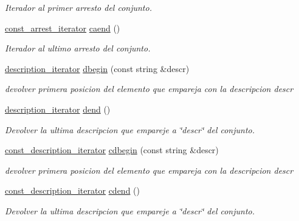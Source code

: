 \begin{DoxyCompactItemize}
\begin{DoxyCompactList}\small\item\em Iterador al primer arresto del conjunto. \end{DoxyCompactList}\item 
\hyperlink{classconjunto_1_1const__arrest__iterator}{const\+\_\+arrest\+\_\+iterator} \hyperlink{classconjunto_af162d00713358699bc36300616c90e89}{caend} ()
\begin{DoxyCompactList}\small\item\em Iterador al ultimo arresto del conjunto. \end{DoxyCompactList}\item 
\hyperlink{classconjunto_1_1description__iterator}{description\+\_\+iterator} \hyperlink{classconjunto_a67554c4c219143b596ba82ec29508e93}{dbegin} (const string \&descr)
\begin{DoxyCompactList}\small\item\em devolver primera posicion del elemento que empareja con la descripcion descr \end{DoxyCompactList}\item 
\hyperlink{classconjunto_1_1description__iterator}{description\+\_\+iterator} \hyperlink{classconjunto_af821d3bc50f2926a95aaa39a04c1ce7e}{dend} ()
\begin{DoxyCompactList}\small\item\em Devolver la ultima descripcion que empareje a \char`\"{}descr\char`\"{} del conjunto. \end{DoxyCompactList}\item 
\hyperlink{classconjunto_1_1const__description__iterator}{const\+\_\+description\+\_\+iterator} \hyperlink{classconjunto_a518331306c092e8b87742cd98bf7c090}{cdbegin} (const string \&descr)
\begin{DoxyCompactList}\small\item\em devolver primera posicion del elemento que empareja con la descripcion descr \end{DoxyCompactList}\item 
\hyperlink{classconjunto_1_1const__description__iterator}{const\+\_\+description\+\_\+iterator} \hyperlink{classconjunto_aa8c9ce5a7a4534fc5169b66807dc023b}{cdend} ()
\begin{DoxyCompactList}\small\item\em Devolver la ultima descripcion que empareje a \char`\"{}descr\char`\"{} del conjunto. \end{DoxyCompactList}\end{DoxyCompactItemize}
